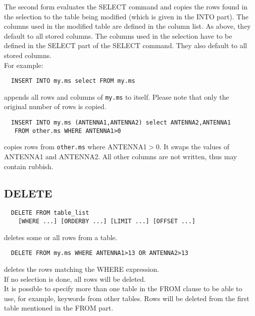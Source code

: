 The second form evaluates the SELECT command and copies the rows
found in the selection to the table being modified (which is given
in the INTO part).
The columns used in the modified table are defined in the column list.
As above, they default to all stored columns. The columns used in the
selection have to be defined in the SELECT part of the SELECT command.
They also default to all stored columns.
\\For example:
\begin{verbatim}
  INSERT INTO my.ms select FROM my.ms
\end{verbatim}
appends all rows and columns of \texttt{my.ms} to itself.
Please note that only the original number of rows is copied.
\begin{verbatim}
  INSERT INTO my.ms (ANTENNA1,ANTENNA2) select ANTENNA2,ANTENNA1
   FROM other.ms WHERE ANTENNA1>0
\end{verbatim}
copies rows from \texttt{other.ms} where ANTENNA1$>$0. It swaps the
values of ANTENNA1 and ANTENNA2. All other columns are not written,
thus may contain rubbish.

\subsection{DELETE}
\begin{verbatim}
  DELETE FROM table_list
    [WHERE ...] [ORDERBY ...] [LIMIT ...] [OFFSET ...]
\end{verbatim}
deletes some or all rows from a table.
\begin{verbatim}
  DELETE FROM my.ms WHERE ANTENNA1>13 OR ANTENNA2>13
\end{verbatim}
deletes the rows matching the WHERE expression.
\\If no selection is done, all rows will be deleted.
\\It is possible to specify more than one table in the FROM clause to
be able to use, for example, keywords from other tables.
Rows will be deleted from the first table mentioned in the FROM part.


